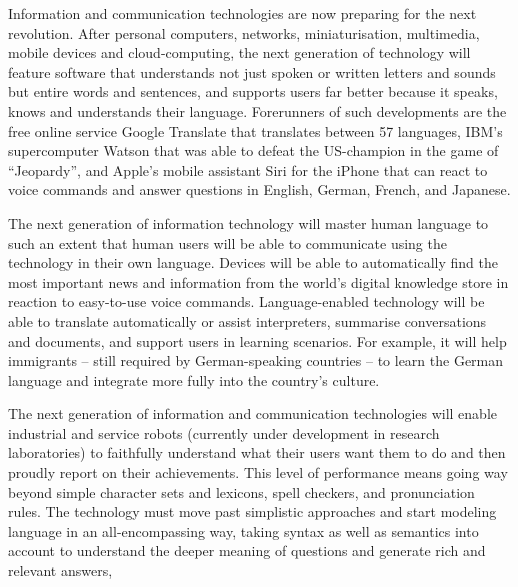 \begin{multicols}{2}
Information and communication technologies are now preparing for the next revolution. After personal computers, networks, miniaturisation, multimedia, mobile devices and cloud-computing, the next generation of technology will feature software that understands not just spoken or written letters and sounds but entire words and sentences, and supports users far better because it speaks, knows and understands their language. Forerunners of such developments are the free online service Google Translate that translates between 57 languages, IBM’s supercomputer Watson that was able to defeat the US-champion in the game of “Jeopardy”, and Apple’s mobile assistant Siri for the iPhone that can react to voice commands and answer questions in English, German, French, and Japanese. 

The next generation of information technology will master human language to such an extent that human users will be able to communicate using the technology in their own language. Devices will be able to automatically find the most important news and information from the world’s digital knowledge store in reaction to easy-to-use voice commands. Language-enabled technology will be able to translate automatically or assist interpreters, summarise conversations and documents, and support users in learning scenarios. For example, it will help immigrants – still required by German-speaking countries – to learn the German language and integrate more fully into the country’s culture.

The next generation of information and communication technologies will enable industrial and service robots (currently under development in research laboratories) to faithfully understand what their users want them to do and then proudly report on their achievements.  
This level of performance means going way beyond simple character sets and lexicons, spell checkers, and pronunciation rules. The technology must move past simplistic approaches and start modeling language in an all-encompassing way, taking syntax as well as semantics into account to understand the deeper meaning of questions and generate rich and relevant answers,


\end{multicols}
